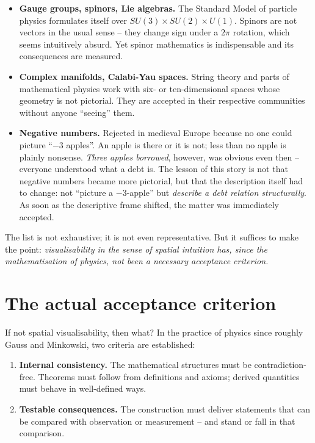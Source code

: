 \begin{itemize}[leftmargin=2em,itemsep=4pt,topsep=4pt]
  \item \textbf{Gauge groups, spinors, Lie algebras.} The Standard
        Model of particle physics formulates itself over
        $SU(3) \times SU(2) \times U(1)$. Spinors are not vectors in
        the usual sense -- they change sign under a $2\pi$ rotation,
        which seems intuitively absurd. Yet spinor mathematics is
        indispensable and its consequences are measured.

  \item \textbf{Complex manifolds, Calabi-Yau spaces.} String theory
        and parts of mathematical physics work with six- or
        ten-dimensional spaces whose geometry is not pictorial. They
        are accepted in their respective communities without anyone
        ``seeing'' them.

  \item \textbf{Negative numbers.} Rejected in medieval Europe
        because no one could picture ``$-3$ apples''. An apple is
        there or it is not; less than no apple is plainly nonsense.
        \emph{Three apples borrowed}, however, was obvious even
        then -- everyone understood what a debt is. The lesson of
        this story is not that negative numbers became more
        pictorial, but that the description itself had to change:
        not ``picture a $-3$-apple'' but \emph{describe a
        debt relation structurally}. As soon as the descriptive
        frame shifted, the matter was immediately accepted.
\end{itemize}

The list is not exhaustive; it is not even representative. But it
suffices to make the point: \emph{visualisability in the sense of
spatial intuition has, since the mathematisation of physics, not
been a necessary acceptance criterion.}

\section{The actual acceptance criterion}

If not spatial visualisability, then what? In the practice of physics
since roughly Gauss and Minkowski, two criteria are established:

\begin{enumerate}[leftmargin=2em,itemsep=4pt,topsep=4pt]
  \item \textbf{Internal consistency.} The mathematical structures
        must be contradiction-free. Theorems must follow from
        definitions and axioms; derived quantities must behave in
        well-defined ways.

  \item \textbf{Testable consequences.} The construction must
        deliver statements that can be compared with observation or
        measurement -- and stand or fall in that comparison.
\end{enumerate}

